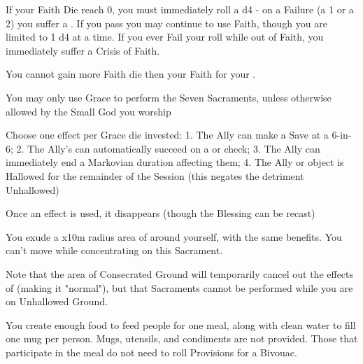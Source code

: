 {If your Faith Die reach 0, you must immediately roll a d4 - on a Failure (a 1 or a 2) you suffer a .  If you pass you may continue to use Faith, though you are limited to 1 d4 at a time.  If you ever Fail your roll while out of Faith, you immediately suffer a Crisis of Faith. 

You cannot gain more Faith die then your \MAX Faith for your \LVL.


You may only use Grace to perform the Seven Sacraments, unless otherwise allowed by the Small God you worship

\LITURGY [
  Name=Bless,
  Link=mystic-sacrament-bless,
  Paradigm=Grace,
  Save=N,
  Duration=Session,
  Counter=n/a,
  Keywords=Splittable,
  Target=Close Ally or object
]



Choose one effect per Grace die invested: 
1. The Ally can make a Save at a 6-in-6; 
2. The Ally's can automatically succeed on a \RO or \RS check;
3. The Ally can immediately end a Markovian duration affecting them;
4. The Ally or object is Hallowed for the remainder of the Session (this negates the detriment Unhallowed)

Once an effect is used, it disappears (though the Blessing can be recast)


\LITURGY [
  Name=Consecrate,
  Link=mystic-sacrament-consecrate,
  Paradigm=Grace,
  Save=N,
  Duration=Concentration,
  Counter=n/a,
  Keywords=None,
  Target=Close radius
]

You exude a \DICE x10m radius area of  around yourself, with the same benefits.  You can't move while concentrating on this Sacrament.

Note that the area of Consecrated Ground will temporarily cancel out the effects of  (making it "normal"), but that Sacraments cannot be performed while you are on Unhallowed Ground.

\LITURGY [
  Name=Create Food,
  Link=mystic-sacrament-create-food,
  Paradigm=Grace,
  Save=N,
  Duration=0,
  Counter=n/a,
  Keywords=None,
  Target=Close radius
]


You create enough food to feed \SUMDICE people for one meal, along with clean water to fill one mug per person. Mugs, utensils, and condiments are not provided.  Those that participate in the meal do not need to roll Provisions for a Bivouac.  

}

